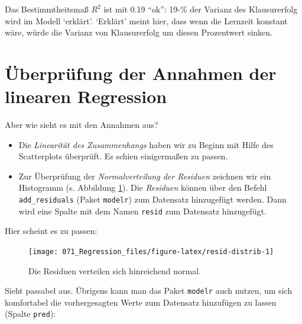 \documentclass[12pt,ngerman,]{book}
\makeatletter
\newenvironment{Shaded}{\begin{snugshade}}{\end{snugshade}}
\newcommand{\KeywordTok}[1]{\textcolor[rgb]{0.13,0.29,0.53}{\textbf{#1}}}
\newcommand{\DataTypeTok}[1]{\textcolor[rgb]{0.13,0.29,0.53}{#1}}
\newcommand{\StringTok}[1]{\textcolor[rgb]{0.31,0.60,0.02}{#1}}
\newcommand{\OperatorTok}[1]{\textcolor[rgb]{0.81,0.36,0.00}{\textbf{#1}}}
\newcommand{\NormalTok}[1]{#1}
\newenvironment{kframe}{%
\medskip{}
\setlength{\fboxsep}{.8em}
 \def\at@end@of@kframe{}%
 \ifinner\ifhmode%
  \def\at@end@of@kframe{\end{minipage}}%
  \begin{minipage}{\columnwidth}%
 \fi\fi%
 \def\FrameCommand##1{\hskip\@totalleftmargin \hskip-\fboxsep
 \colorbox{shadecolor}{##1}\hskip-\fboxsep
     \hskip-\linewidth \hskip-\@totalleftmargin \hskip\columnwidth}%
 \MakeFramed {\advance\hsize-\width
   \@totalleftmargin\z@ \linewidth\hsize
   \@setminipage}}%
 {\par\unskip\endMakeFramed%
 \at@end@of@kframe}
\renewenvironment{Shaded}{\begin{kframe}}{\end{kframe}}
\theoremstyle{definition}
\theoremstyle{definition}
\theoremstyle{remark}
\makeatother
\begin{document}
Das Bestimmtheitsmaß \(R^2\) ist mit 0.19 ``ok'': 19-\% der Varianz des
Klausurerfolg wird im Modell `erklärt'. `Erklärt' meint hier, dass wenn
die Lernzeit konstant wäre, würde die Varianz von Klausurerfolg um
diesen Prozentwert sinken.

\section{Überprüfung der Annahmen der linearen
Regression}\label{uberprufung-der-annahmen-der-linearen-regression}

Aber wie sieht es mit den Annahmen aus?

\begin{itemize}
\item
  Die \emph{Linearität des Zusammenhangs} haben wir zu Beginn mit Hilfe
  des Scatterplots überprüft. Es schien einigermaßen zu passen.
\item
  Zur Überprüfung der \emph{Normalverteilung der Residuen} zeichnen wir
  ein Histogramm (s. Abbildung \ref{fig:resid-distrib}). Die
  \emph{Residuen} können über den Befehl
  \texttt{add\_residuals} (Paket \texttt{modelr}) zum Datensatz
  hinzugefügt werden. Dann wird eine Spalte mit dem Namen \texttt{resid}
  zum Datensatz hinzugefügt.
\end{itemize}

Hier scheint es zu passen:

\begin{Shaded}
\end{Shaded}

\begin{figure}

{\centering \texttt{[image: 071\_Regression\_files/figure-latex/resid-distrib-1]} 

}

\caption{Die Residuen verteilen sich hinreichend normal.}\label{fig:resid-distrib}
\end{figure}

Sieht passabel aus. Übrigens kann man das Paket \texttt{modelr} auch
nutzen, um sich komfortabel die vorhergesagten Werte zum Datensatz
hinzufügen zu lassen (Spalte \texttt{pred}):
\end{document}
